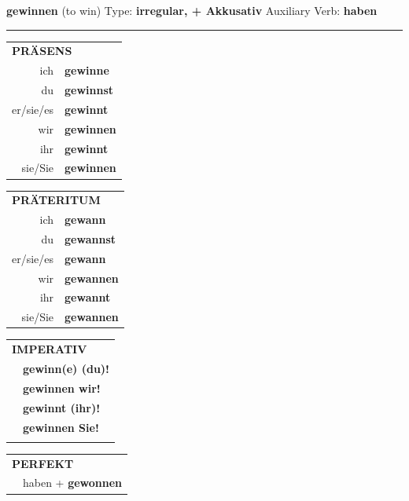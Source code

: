 \documentclass[10pt,a4paper]{revtex4-2}
\begin{document}
\begin{verbbox-acc}
    {\Large \bf gewinnen} (to win) \hfill Type: \textbf{irregular, + Akkusativ} \hfill Auxiliary Verb: \textbf{haben} 
    
     \vspace{5pt}

    \hrule
    
    \vspace{5pt}

  \begin{tabular}{rl}
     \multicolumn{2}{l}{\textbf{PRÄSENS} }\\
    ich & \textbf{gewinne}\\
    du & \textbf{gewinnst}\\
    er/sie/es & \textbf{gewinnt}\\
    wir & \textbf{gewinnen}\\
    ihr & \textbf{gewinnt}\\
    sie/Sie & \textbf{gewinnen}\\
  \end{tabular}
  \hfill
     \begin{tabular}{rl}
    \multicolumn{2}{l}{\textbf{PRÄTERITUM} }\\
    ich & \textbf{gewann}\\
    du & \textbf{gewannst}\\
    er/sie/es & \textbf{gewann}\\
    wir & \textbf{gewannen}\\
    ihr & \textbf{gewannt}\\
    sie/Sie & \textbf{gewannen}\\
  \end{tabular}
  \hfill
  \begin{tabular}{rl}
     \multicolumn{2}{l}{\textbf{IMPERATIV} }\\
   & \textbf{gewinn(e) (du)!}\\
   & \textbf{gewinnen wir!}\\
   & \textbf{gewinnt (ihr)!}\\
   & \textbf{gewinnen Sie!}\\
   & \vspace{10pt}
  \end{tabular}

    \vspace{10pt}

 \begin{tabular}{rl}
     \multicolumn{2}{l}{\textbf{PERFEKT}}\\
  &  haben + \textbf{gewonnen}\\
  \end{tabular}
\hfill
   \begin{tabular}{rl}
   

\end{tabular}
\end{verbbox-acc}
\end{document}
